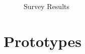 \documentclass[oneside]{report}
\begin{document}
\begin{figure}[H]
			\caption{Survey Results}%
			\label{Survey Results}%
		\end{figure}

	\chapter{Prototypes}

\end{document}
